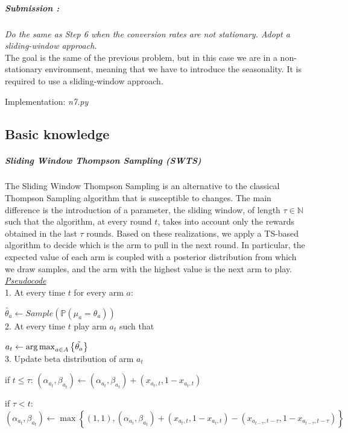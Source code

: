 \subparagraph*{Submission : }
\textit{Do the same as Step 6 when the conversion rates are not stationary. Adopt a sliding-window approach.}\\

The goal is the same of the previous problem, but in this case we are in a non-stationary environment, meaning that we have to introduce the seasonality. It is required to use a sliding-window approach.

Implementation: \textit{n7.py}
\subsection*{Basic knowledge}
\subparagraph*{Sliding Window Thompson Sampling (SWTS)} 
The Sliding Window Thompson Sampling is an alternative to the classical Thompson Sampling algorithm that is susceptible to changes. The main difference is the introduction of a parameter, the sliding window, of length $\tau\in \mathbb{N}$ such that the algorithm, at every round $t$, takes into account only the rewards obtained in the last $\tau$ rounds. Based on these realizations, we apply a TS-based algorithm to decide which is the arm to pull in the next round. In particular, the expected value of each arm is coupled with a posterior distribution from which we draw samples, and the arm with the highest value is the next arm to play.\\

\underline{\textit{Pseudocode}}\\
1. At every time $t$ for every arm $a$:

\hspace{2em}$\tilde{\theta_{a}} \leftarrow Sample(\mathbb P(\mu_{a}=\theta_{a}))$ \\

2. At every time $t$ play arm $a_{t}$ such that 

\hspace{2em}$a_{t} \leftarrow \operatorname{arg\,max}_{a \in A} \left\{ \tilde{\theta_{a}}  \right\} $ \\

3.  Update beta distribution of arm $a_{t}$

\hspace{2em}if $t\leq\tau$: $(\alpha_{a_{t}}, \beta_{a_{t}}) \leftarrow (\alpha_{a_{t}}, \beta_{a_{t}}) + (x_{a_{t},t}, 1 - x_{a_{t},t})$ 

\hspace{2em}if $\tau<t$:	$(\alpha_{a_{t}}, \beta_{a_{t}}) \leftarrow \max \left\{(1,1), (\alpha_{a_{t}}, \beta_{a_{t}}) + (x_{a_{t},t}, 1 - x_{a_{t},t}) - (x_{a_{t-\tau},t-\tau}, 1 - x_{a_{t-\tau},t-\tau})    \right\}$

